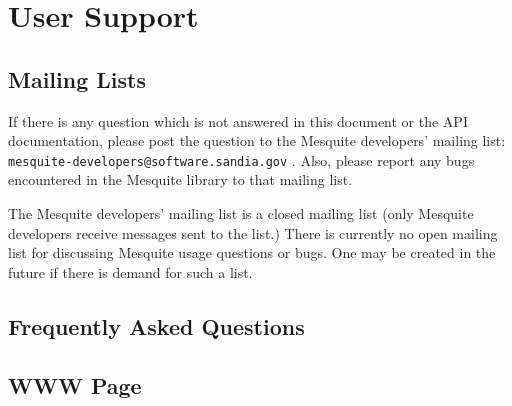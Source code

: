\chapter{User Support}

\section{Mailing Lists}

If there is any question which is not answered in this document or the API
documentation, please post the question to the Mesquite developers' 
mailing list:  {\tt mesquite-developers@software.sandia.gov} .  Also,
please report any bugs encountered in the Mesquite library to that mailing
list.

The Mesquite developers' mailing list is a closed mailing list (only
Mesquite developers receive messages sent to the list.)  There is 
currently no open mailing list for discussing Mesquite usage questions
or bugs.  One may be created in the future if there is demand for such
a list.  

\section{Frequently Asked Questions}

\section{WWW Page}

